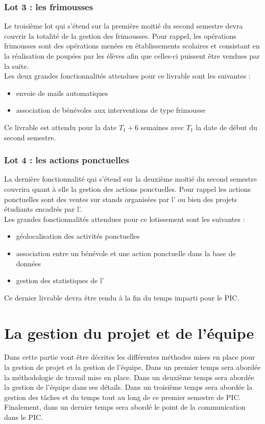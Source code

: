 \documentclass[asi]{picInsa}
\begin{document}
\subsection{Lot 3 : les frimousses}
Le troisième lot qui s'étend sur la première moitié du second semestre devra couvrir la totalité de la gestion des frimousses. Pour rappel, les opérations frimousses sont des opérations menées en établissements scolaires et consistant en la réalisation de poupées par les élèves afin que celles-ci puissent être vendues par la suite.\\
Les deux grandes fonctionnalités attendues pour ce livrable sont les suivantes :
\begin{itemize}
	\item envoie de mails automatiques
	\item association de bénévoles aux interventions de type frimousse\vspace{0.5cm}
\end{itemize}

Ce livrable est attendu pour la date $T_{1}+6$ semaines avec $T_{1}$ la date de début du second semestre.

\subsection{Lot 4 : les actions ponctuelles}
La dernière fonctionnalité qui s'étend sur la deuxième moitié du second semestre couvrira quant à elle la gestion des actions ponctuelles. Pour rappel les actions ponctuelles sont des ventes sur stands organisées par l'\nomClient{} ou bien des projets étudiants encadrés par l'\nomClient{}.\\
Les grandes fonctionnalités attendues pour ce lotissement sont les suivantes : 
\begin{itemize}
	\item géolocalisation des activités ponctuelles
	\item association entre un bénévole et une action ponctuelle dans la base de données
	\item gestion des statistiques de l'\nomClient{}\vspace{0.5cm}
\end{itemize}
Ce dernier livrable devra être rendu à la fin du temps imparti pour le PIC.





\chapter{La gestion du projet et de l'équipe}
\label{gestion_equipe}
Dans cette partie vont être décrites les différentes méthodes mises en place pour la gestion de projet et la gestion de l'équipe. Dans un premier temps sera abordée la méthodologie de travail mise en place. Dans un deuxième temps sera abordée la gestion de l'équipe dans ses détails. Dans un troisième temps sera abordée la gestion des tâches et du temps tout au long de ce premier semestre de PIC. Finalement, dans un dernier temps sera abordé le point de la communication dans le PIC.
\end{document}
